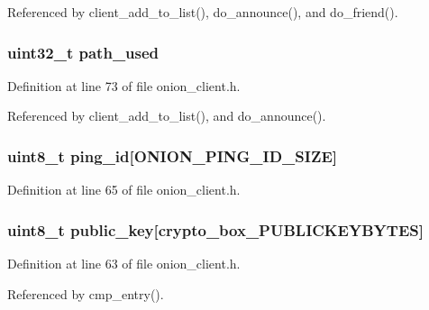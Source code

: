 Referenced by client\+\_\+add\+\_\+to\+\_\+list(), do\+\_\+announce(), and do\+\_\+friend().

\hypertarget{struct_onion___node_a75c3cb4fcbcf13c47379cc14737926d9}{
\subsubsection[{path\+\_\+used}]{\setlength{\rightskip}{0pt plus 5cm}uint32\+\_\+t path\+\_\+used}}\label{struct_onion___node_a75c3cb4fcbcf13c47379cc14737926d9}


Definition at line 73 of file onion\+\_\+client.\+h.



Referenced by client\+\_\+add\+\_\+to\+\_\+list(), and do\+\_\+announce().

\hypertarget{struct_onion___node_aa21328f812472705a8d7bcee491bb54d}{
\subsubsection[{ping\+\_\+id}]{\setlength{\rightskip}{0pt plus 5cm}uint8\+\_\+t ping\+\_\+id\mbox{[}{\bf O\+N\+I\+O\+N\+\_\+\+P\+I\+N\+G\+\_\+\+I\+D\+\_\+\+S\+I\+Z\+E}\mbox{]}}}\label{struct_onion___node_aa21328f812472705a8d7bcee491bb54d}


Definition at line 65 of file onion\+\_\+client.\+h.

\hypertarget{struct_onion___node_aaa806bb1136fb3d4b5d8d8970b596ff7}{
\subsubsection[{public\+\_\+key}]{\setlength{\rightskip}{0pt plus 5cm}uint8\+\_\+t public\+\_\+key\mbox{[}crypto\+\_\+box\+\_\+\+P\+U\+B\+L\+I\+C\+K\+E\+Y\+B\+Y\+T\+E\+S\mbox{]}}}\label{struct_onion___node_aaa806bb1136fb3d4b5d8d8970b596ff7}


Definition at line 63 of file onion\+\_\+client.\+h.



Referenced by cmp\+\_\+entry().

